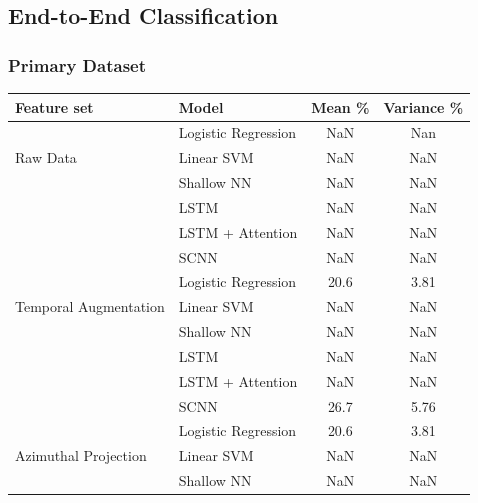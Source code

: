 \documentclass[utf8]{frontiersSCNS} %
\begin{document}

\subsection{End-to-End Classification}

\subsubsection{Primary Dataset}

\begin{table}[t]
  \centering
  \label{tab:end2end_results}
  \begin{tabular}{l l | c | c}
    \toprule
    \textbf{Feature set} & \textbf{Model} & \textbf{Mean \%} & \textbf{Variance \%} \\
    \toprule
    \multirow{3}{*}{Raw Data}
                         & Logistic Regression & NaN & Nan  \\
                         & Linear SVM          & NaN & NaN  \\
                         & Shallow NN          & NaN & NaN  \\
                         & LSTM                & NaN & NaN  \\
                         & LSTM + Attention    & NaN & NaN  \\ 
                         & SCNN                & NaN & NaN  \\
    \midrule
    \multirow{3}{*}{Temporal Augmentation}
                         & Logistic Regression & 20.6 & 3.81  \\
                         & Linear SVM          & NaN & NaN  \\
                         & Shallow NN          & NaN & NaN  \\
                         & LSTM                & NaN & NaN  \\
                         & LSTM + Attention    & NaN & NaN  \\ 
                         & SCNN                & 26.7 & 5.76  \\
    \midrule
    \multirow{3}{*}{Azimuthal Projection}
                         & Logistic Regression & 20.6 & 3.81  \\
                         & Linear SVM          & NaN & NaN  \\
                         & Shallow NN          & NaN & NaN  \\

\end{tabular}
\end{table}
\end{document}
